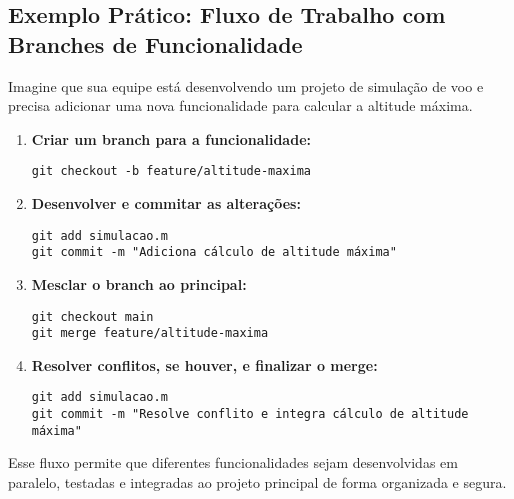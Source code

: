 


\subsection{Exemplo Prático: Fluxo de Trabalho com Branches de Funcionalidade}

Imagine que sua equipe está desenvolvendo um projeto de simulação de voo e precisa adicionar uma nova funcionalidade para calcular a altitude máxima.

\begin{enumerate}
    \item \textbf{Criar um branch para a funcionalidade:}
    \begin{lstlisting}[style=shellstyle]
git checkout -b feature/altitude-maxima
    \end{lstlisting}
    \item \textbf{Desenvolver e commitar as alterações:}
    \begin{lstlisting}[style=shellstyle]
git add simulacao.m
git commit -m "Adiciona cálculo de altitude máxima"
    \end{lstlisting}
    \item \textbf{Mesclar o branch ao principal:}
    \begin{lstlisting}[style=shellstyle]
git checkout main
git merge feature/altitude-maxima
    \end{lstlisting}
    \item \textbf{Resolver conflitos, se houver, e finalizar o merge:}
    \begin{lstlisting}[style=shellstyle]
git add simulacao.m
git commit -m "Resolve conflito e integra cálculo de altitude máxima"
    \end{lstlisting}
\end{enumerate}

Esse fluxo permite que diferentes funcionalidades sejam desenvolvidas em paralelo, testadas e integradas ao projeto principal de forma organizada e segura.



